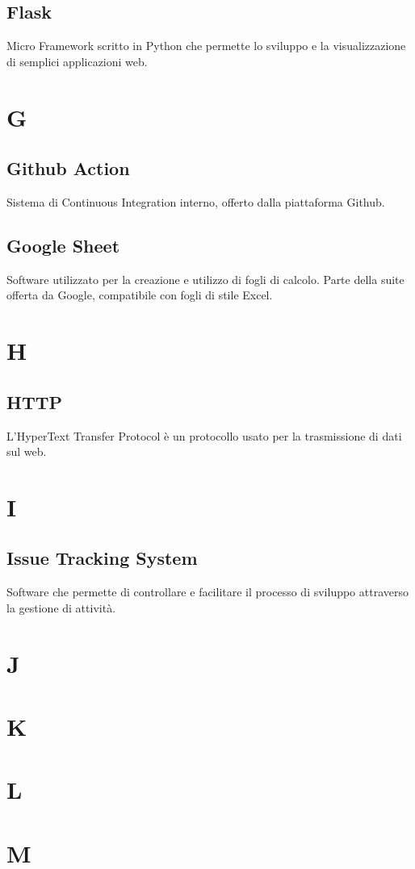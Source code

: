 \subsection{Flask}
Micro Framework scritto in Python che permette lo sviluppo e la visualizzazione di semplici applicazioni web.
\section{G}
\subsection{Github Action}
Sistema di Continuous Integration interno, offerto dalla piattaforma Github.
\subsection{Google Sheet}
Software utilizzato per la creazione e utilizzo di fogli di calcolo. Parte della suite offerta da Google, compatibile con fogli di stile Excel.
\section{H}
\subsection{HTTP}
L'HyperText Transfer Protocol è un protocollo usato per la trasmissione di dati sul web.
\section{I}
\subsection{Issue Tracking System}
Software che permette di controllare e facilitare il processo di sviluppo attraverso la gestione di attività.
\newpage
\section{J}
\section{K}
\section{L}
\section{M}
